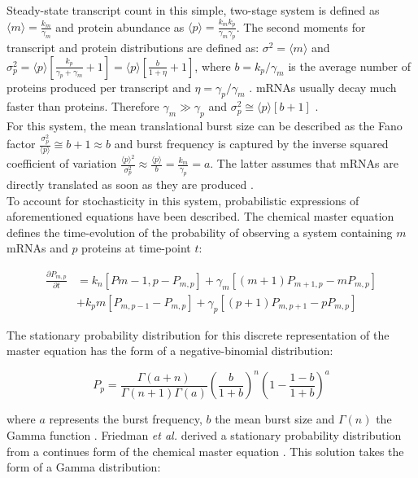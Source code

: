 \doublespacing
\noindent Steady-state transcript count in this simple, two-stage system is defined as $\langle{}m\rangle{}=\frac{k_m}{\gamma_m}$  and protein abundance as $\langle{}p\rangle{}=\frac{k_mk_p}{\gamma_m\gamma_p }$. The second moments for transcript and protein distributions are defined as: $\sigma^2=\langle{}m\rangle{}$ and $\sigma_p^2=\langle{}p\rangle{}\left[\frac{k_p}{\gamma_p+\gamma_m}+1\right]=\langle{}p\rangle{}\left[\frac{b}{1+\eta}+1\right]$, where $b=k_p/\gamma_m$  is the average number of proteins produced per transcript and $\eta=\gamma_p/\gamma_m$  \citep{Tsimring2014, Thattai2001}. mRNAs usually decay much faster than proteins. Therefore $\gamma_m\gg{}\gamma_p$ and $\sigma_p^2\cong\langle{}p\rangle{}\left[b+1\right]$ \citep{Thattai2001}.\\
For this system, the mean translational burst size can be described as the Fano factor $\frac{\sigma_p^2}{\langle{}p\rangle}\cong{}b+1\approx{}b$ and burst frequency is captured by the inverse squared coefficient of variation $\frac{\langle{}p\rangle{}^2}{\sigma_p^2}\approx{}\frac{\langle{}p\rangle{}}{b}=\frac{k_m}{\gamma_p}=a$. The latter assumes that mRNAs are directly translated as soon as they are produced \citep{Friedman2006}.\\

\onehalfspacing
\noindent To account for stochasticity in this system, probabilistic expressions of aforementioned equations have been described. The chemical master equation defines the time-evolution of the probability of observing a system containing $m$ mRNAs and $p$ proteins at time-point $t$:

\begin{align}
\frac{\partial{}P_{m,p}}{\partial{}t}&=k_n\left[P{m-1,p}-P_{m,p}\right]+\gamma_m\left[(m+1)P_{m+1,p}-mP_{m,p}\right] \nonumber \\
&+k_pm\left[P_{m,p-1}-P_{m,p}\right]+\gamma_p\left[(p+1)P_{m,p+1}-pP_{m,p}\right]
\end{align}

\noindent The stationary probability distribution for this discrete representation of the master equation has the form of a negative-binomial distribution:

\begin{equation}
P_p=\frac{\Gamma(a+n)}{\Gamma(n+1)\Gamma(a)}\left(\frac{b}{1+b}\right)^n\left(1-\frac{1-b}{1+b}\right)^a
\end{equation}

\noindent where $a$ represents the burst frequency, $b$ the mean burst size and $\Gamma(n)$ the Gamma function \citep{Shahrezaei2008}. Friedman \textit{et al.} derived a stationary probability distribution from a continues form of the chemical master equation \citep{Friedman2006}. This solution takes the form of a Gamma distribution:

